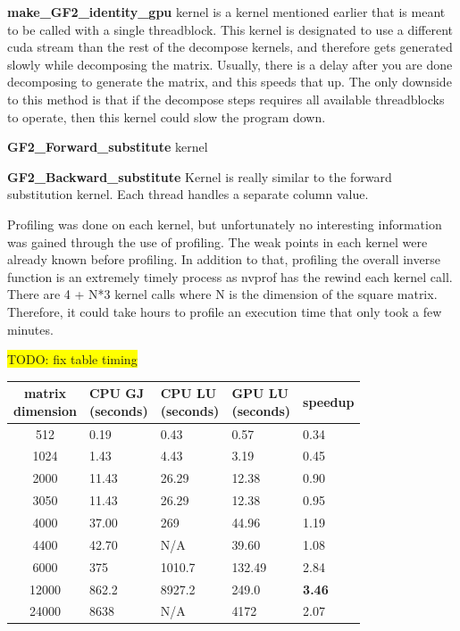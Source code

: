\documentclass[conference]{IEEEtran}
\begin{document}
        
        \textbf{make\_GF2\_identity\_gpu} kernel is a kernel mentioned earlier that is meant to be called with a single threadblock. This kernel is designated to use a different cuda stream than the rest of the decompose kernels, and therefore gets generated slowly while decomposing the matrix. Usually, there is a delay after you are done decomposing to generate the matrix, and this speeds that up. The only downside to this method is that if the decompose steps requires all available threadblocks to operate, then this kernel could slow the program down.
        

        \textbf{GF2\_Forward\_substitute} kernel 


        \textbf{GF2\_Backward\_substitute} Kernel is really similar to the forward substitution kernel. Each thread handles a separate column value.


        Profiling was done on each kernel, but unfortunately no interesting information was gained through the use of profiling. The weak points in each kernel were already known before profiling. In addition to that, profiling the overall inverse function is an extremely timely process as nvprof has the rewind each kernel call. There are 4 + N*3 kernel calls where N is the dimension of the square matrix. Therefore, it could take hours to profile an execution time that only took a few minutes.
        
        
        
        \colorbox{yellow}{TODO: fix table timing}
        \begin{center}
            {
            \begin{tabular}{ | c | p{1.2cm} | p{1.2cm} | p{1.2cm} | p{1.2cm} | } \hline
                \shortstack{matrix\\dimension} & \shortstack{CPU GJ\\(seconds)} & \shortstack{CPU LU\\(seconds)} & \shortstack{GPU LU\\(seconds)} & speedup\\\hline
                512 & 0.19 & 0.43 & 0.57 & 0.34\\ \hline
                1024 & 1.43 & 4.43 & 3.19 & 0.45\\ \hline
                2000 & 11.43 & 26.29 & 12.38 & 0.90\\ \hline
                3050 & 11.43 & 26.29 & 12.38 & 0.95\\ \hline
                4000 & 37.00 & 269 & 44.96 & 1.19\\ \hline
                4400 & 42.70 & N/A & 39.60 & 1.08\\ \hline
                6000 & 375 & 1010.7 & 132.49 & 2.84\\ \hline
                12000 & 862.2 & 8927.2 & 249.0 & \textbf{3.46}\\ \hline
                24000 & 8638 & N/A & 4172 & 2.07\\ \hline
            \end{tabular}
            }
            \label{fig:inverse_table}
        \end{center}
\end{document}
